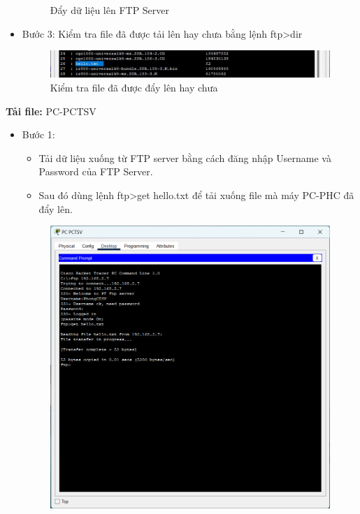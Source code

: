 \documentclass[12pt, a4paper]{article}
\begin{document}
\begin{flushleft}
\begin{itemize}[leftmargin=0.75cm]
\begin{figure}[H]
				\caption{Đẩy dữ liệu lên FTP Server}
			\end{figure}
			\item Bước 3: Kiểm tra file đã được tải lên hay chưa bằng lệnh ftp>dir
			\begin{figure}[H]
				\centering
				\includegraphics[width=1\textwidth]{data_uploadcompletely.jpg}
				\caption{Kiểm tra file đã được đẩy lên hay chưa}
			\end{figure}
		\end{itemize}
		\newpage
		\textbf{Tải file:} PC-PCTSV \\
		\begin{itemize}[leftmargin=0.75cm]
			\item Bước 1:
			\begin{itemize}[leftmargin=1cm] 
				\item Tải dữ liệu xuống từ FTP server bằng cách đăng nhập Username và Password của FTP Server. 
				\item Sau đó dùng lệnh ftp>get hello.txt để tải xuống file mà máy PC-PHC đã đẩy lên.
			\end{itemize}
			\begin{figure}[H]
				\centering
				\includegraphics[width=1\textwidth]{ftp_datainstall.jpg}

\end{figure}
\end{itemize}
\end{flushleft}
\end{document}
